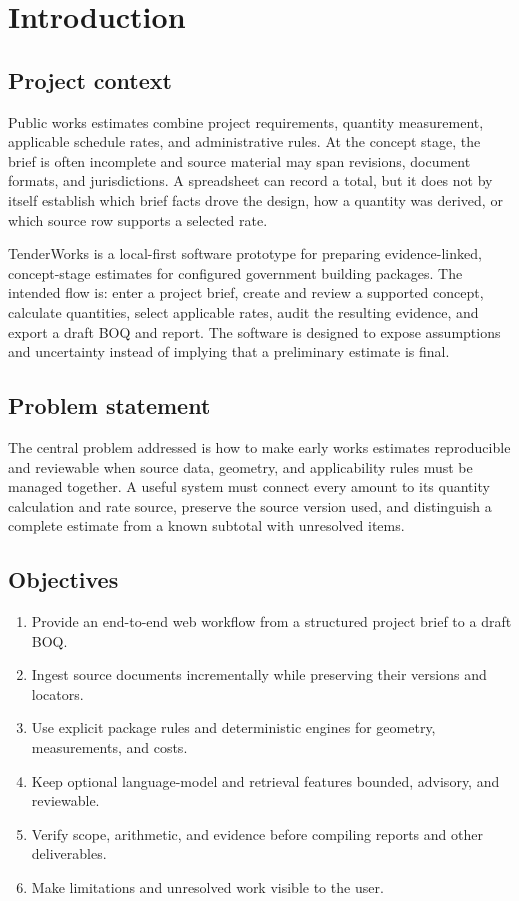 \section{Introduction}
\subsection{Project context}
Public works estimates combine project requirements, quantity measurement, applicable schedule rates, and administrative rules. At the concept stage, the brief is often incomplete and source material may span revisions, document formats, and jurisdictions. A spreadsheet can record a total, but it does not by itself establish which brief facts drove the design, how a quantity was derived, or which source row supports a selected rate.

TenderWorks is a local-first software prototype for preparing evidence-linked, concept-stage estimates for configured government building packages. The intended flow is: enter a project brief, create and review a supported concept, calculate quantities, select applicable rates, audit the resulting evidence, and export a draft BOQ and report. The software is designed to expose assumptions and uncertainty instead of implying that a preliminary estimate is final.

\subsection{Problem statement}
The central problem addressed is how to make early works estimates reproducible and reviewable when source data, geometry, and applicability rules must be managed together. A useful system must connect every amount to its quantity calculation and rate source, preserve the source version used, and distinguish a complete estimate from a known subtotal with unresolved items.

\subsection{Objectives}
\begin{enumerate}[leftmargin=*]
  \item Provide an end-to-end web workflow from a structured project brief to a draft BOQ.
  \item Ingest source documents incrementally while preserving their versions and locators.
  \item Use explicit package rules and deterministic engines for geometry, measurements, and costs.
  \item Keep optional language-model and retrieval features bounded, advisory, and reviewable.
  \item Verify scope, arithmetic, and evidence before compiling reports and other deliverables.
  \item Make limitations and unresolved work visible to the user.
\end{enumerate}

